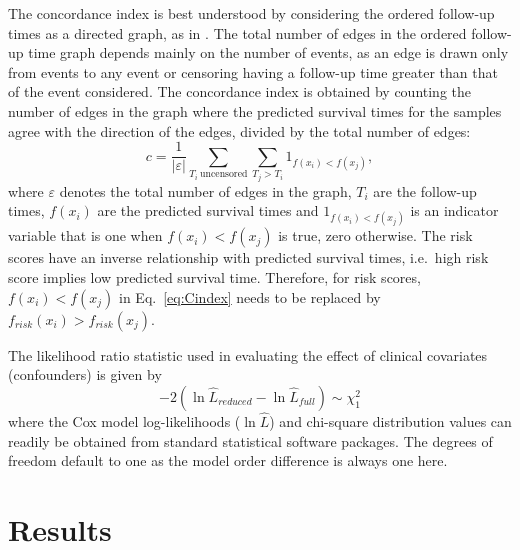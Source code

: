 \documentclass[letterpaper,12pt]{article}
\begin{document}
The concordance index is best understood by considering the ordered follow-up times as a directed graph, as in \citet{Raykar:07}. The total number of edges in the ordered follow-up time graph depends mainly on the number of events, as an edge is drawn only from events to any event or censoring having a follow-up time greater than that of the event considered. The concordance index is obtained by counting the number of edges in the graph where the predicted survival times for the samples agree with the direction of the edges, divided by the total number of edges:
\begin{equation}
c=\frac{1}{|\varepsilon |}\sum_{T_i~\text{uncensored} }\sum_{T_j > T_i}1_{f(x_i)<f(x_j)},
\label{eq:Cindex}
\end{equation}
where $\varepsilon$ denotes the total number of edges in the graph, $T_i$ are the follow-up times, $f(x_i)$ are the predicted survival times and $1_{f(x_i)<f(x_j)}$ is an indicator variable that is one when ${f(x_i)<f(x_j)}$ is true, zero otherwise. The risk scores have an inverse relationship with predicted survival times, i.e.\ high risk score implies low predicted survival time. Therefore, for risk scores, $f(x_i)<f(x_j)$ in Eq.\ \ref{eq:Cindex} needs to be replaced by $f_{risk}(x_i)>f_{risk}(x_j)$.

The likelihood ratio statistic used in evaluating the effect of clinical covariates (confounders) is given by
\begin{equation}
-2\left(\ln\hat{L}_{reduced} - \ln\hat{L}_{full} \right) \sim \chi^2_1
\label{eq:LRtest}
\end{equation}
where the Cox model log-likelihoods ($\ln\hat{L}$) and chi-square distribution values can readily be obtained from standard statistical software packages. The degrees of freedom default to one as the model order difference is always one here.



\section{Results}
\end{document}
